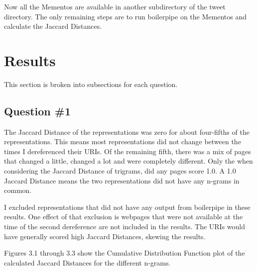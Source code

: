 \documentclass[a4paper,12pt]{article}
\begin{document}
Now all the Mementos are available in another subdirectory of the tweet directory. The only remaining steps
are to run boilerpipe on the Mementos and calculate the Jaccard Distances.

\section{Results}
This section is broken into subsections for each question.

\subsection{Question \#1}
The Jaccard Distance of the representations was zero for about four-fifths of the representations. This means
most representations did not change between the times I dereferenced their URIs. Of the remaining fifth,
there was a mix of pages that changed a little, changed a lot and were completely different. Only the
when considering the Jaccard Distance of trigrams, did any pages score 1.0. A 1.0 Jaccard Distance means
the two representations did not have any n-grams in common.

I excluded representations that did not have any output from boilerpipe in these results. One effect of that
exclusion is webpages that were not available at the time of the second dereference are not included in the
results. The URIs would have generally scored high Jaccard Distances, skewing the results.

Figures 3.1 through 3.3 show the Cumulative Distribution Function plot of the calculated Jaccard Distances
for the different n-grams.
\end{document}
